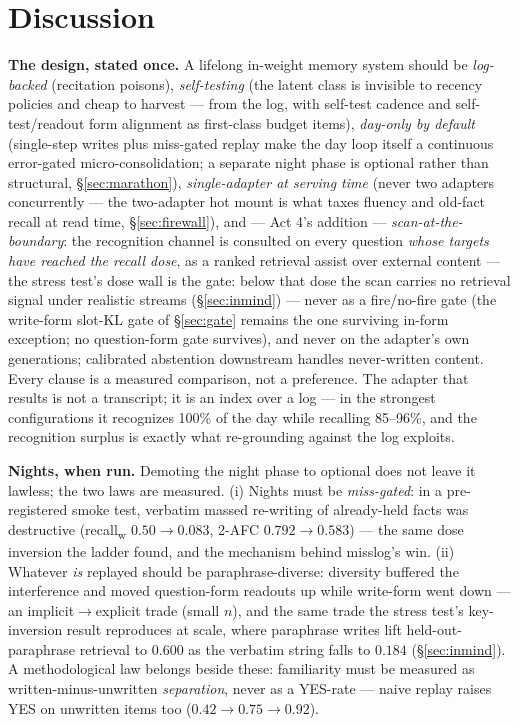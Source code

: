 \documentclass[11pt]{article}
\begin{document}

\section{Discussion}\label{sec:discussion}

\textbf{The design, stated once.} A lifelong in-weight memory system should be \emph{log-backed}
(recitation poisons), \emph{self-testing} (the latent class is invisible to recency policies and
cheap to harvest --- from the log, with self-test cadence and self-test/readout form alignment
as first-class budget items), \emph{day-only by default} (single-step writes plus miss-gated
replay make the day loop itself a continuous error-gated micro-consolidation; a separate night
phase is optional rather than structural, \S\ref{sec:marathon}), \emph{single-adapter at
serving time} (never two adapters concurrently --- the two-adapter hot mount is what taxes
fluency and old-fact recall at read time, \S\ref{sec:firewall}), and --- Act 4's addition ---
\emph{scan-at-the-boundary}: the recognition channel is consulted on every question
\emph{whose targets have reached the recall dose}, as
a ranked retrieval assist over external content --- the stress test's dose wall is the
gate: below that dose the scan carries no retrieval signal under realistic streams
(\S\ref{sec:inmind}) --- never as a fire/no-fire gate (the
write-form slot-KL gate of \S\ref{sec:gate} remains the one surviving in-form exception; no
question-form gate survives), and never on
the adapter's own generations; calibrated abstention downstream handles never-written content.
Every clause is a measured comparison, not a preference. The adapter that
results is not a transcript; it is an index over a log --- in the strongest configurations it
recognizes 100\% of the day while recalling 85--96\%, and the recognition surplus is exactly
what re-grounding against the log exploits.

\textbf{Nights, when run.} Demoting the night phase to optional does not leave it lawless; the
two laws are measured. (i) Nights must be \emph{miss-gated}: in a pre-registered smoke test,
verbatim massed re-writing of already-held facts was destructive (recall\textsubscript{w}
$0.50\to0.083$, 2-AFC $0.792\to0.583$) --- the same dose inversion the ladder found, and the
mechanism behind misslog's win. (ii) Whatever \emph{is} replayed should be paraphrase-diverse:
diversity buffered the interference and moved question-form readouts up while write-form went
down --- an implicit$\to$explicit trade (small $n$), and the same trade the stress test's
key-inversion result reproduces at scale, where paraphrase writes lift held-out-paraphrase
retrieval to $0.600$ as the verbatim string falls to $0.184$ (\S\ref{sec:inmind}). A methodological law belongs beside these:
familiarity must be measured as written-minus-unwritten \emph{separation}, never as a YES-rate
--- naive replay raises YES on unwritten items too ($0.42\to0.75\to0.92$).
\end{document}
